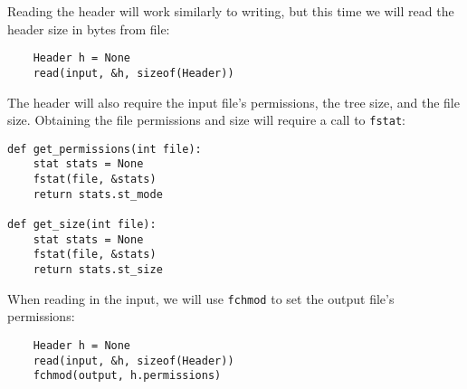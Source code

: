 \documentclass[12pt]{article}
\begin{document}
Reading the header will work similarly to writing, but this time we will read the header size in bytes from file:
\begin{verbatim}
    Header h = None
    read(input, &h, sizeof(Header))
\end{verbatim}
The header will also require the input file's permissions, the tree size, and the file size. Obtaining the file permissions and size will require a call to \verb|fstat|:
\begin{verbatim}
def get_permissions(int file):
    stat stats = None
    fstat(file, &stats)
    return stats.st_mode

def get_size(int file):
    stat stats = None
    fstat(file, &stats)
    return stats.st_size
\end{verbatim}
When reading in the input, we will use \verb|fchmod| to set the output file's permissions:
\begin{verbatim}
    Header h = None
    read(input, &h, sizeof(Header))
    fchmod(output, h.permissions)
\end{verbatim}
\end{document}
